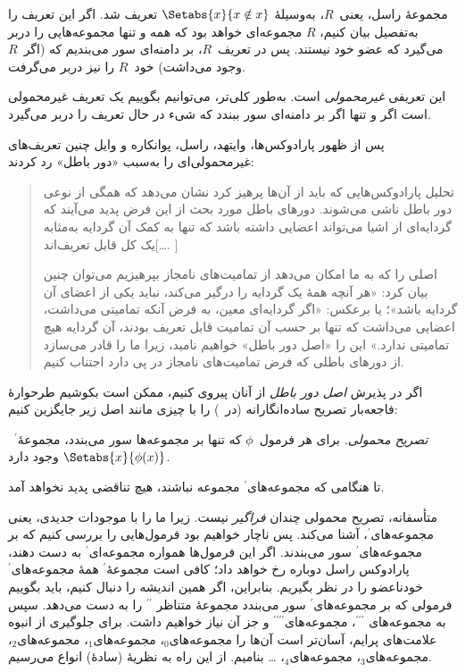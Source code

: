 \documentclass[../../../include/open-logic-section]{subfiles}
\begin{document}


مجموعهٔ راسل، یعنی~$R$، به‌وسیلهٔ
$\Setabs{x}{x \notin x}$ تعریف شد. اگر این تعریف را به‌تفصیل بیان کنیم،
$R$ مجموعه‌ای خواهد بود که همه و تنها مجموعه‌هایی را دربر می‌گیرد که عضو
خود نیستند. پس در تعریف~$R$، بر دامنه‌ای سور می‌بندیم که (اگر~$R$ وجود
می‌داشت) خود~$R$ را نیز دربر می‌گرفت.

این تعریفی \emph{غیرمحمولی} است. به‌طور کلی‌تر، می‌توانیم بگوییم یک تعریف
غیرمحمولی است اگر و تنها اگر بر دامنه‌ای سور ببندد که شیء در حال تعریف را
دربر می‌گیرد.
	
پس از ظهور پارادوکس‌ها، وایتهد، راسل، پوانکاره و وایل چنین تعریف‌های
غیرمحمولی‌ای را به‌سبب «دور باطل» رد کردند:
\begin{quote}
	تحلیل پارادوکس‌هایی که باید از آن‌ها پرهیز کرد نشان می‌دهد که همگی از
	نوعی دور باطل ناشی می‌شوند. دورهای باطل مورد بحث از این فرض پدید
	می‌آیند که گردایه‌ای از اشیا می‌تواند اعضایی داشته باشد که تنها به کمک
	آن گردایه به‌مثابه یک کل قابل تعریف‌اند[\ldots. \textparagraph]

	اصلی را که به ما امکان می‌دهد از تمامیت‌های نامجاز بپرهیزیم می‌توان
	چنین بیان کرد: «هر آنچه همهٔ یک گردایه را درگیر می‌کند، نباید یکی از
	اعضای آن گردایه باشد»؛ یا برعکس: «اگر گردایه‌ای معین، به فرض آنکه
	تمامیتی می‌داشت، اعضایی می‌داشت که تنها بر حسب آن تمامیت قابل تعریف
	بودند، آن گردایه هیچ تمامیتی ندارد.» این را «اصل دور باطل» خواهیم
	نامید، زیرا ما را قادر می‌سازد از دورهای باطلی که فرض تمامیت‌های نامجاز
	در پی دارد اجتناب کنیم.
	\citep[p.~37]{WhiteheadRussell1910}
\end{quote}
اگر در پذیرش \emph{اصل دور باطل} از آنان پیروی کنیم، ممکن است بکوشیم
طرحوارهٔ فاجعه‌بار تصریح ساده‌انگارانه (در~)
را با چیزی مانند اصل زیر جایگزین کنیم:

\begin{defish}
\emph{تصریح محمولی.} برای هر فرمول~$\phi$ که تنها بر مجموعه‌ها سور می‌بندد، مجموعهٔ$^\prime$~$\Setabs{x}{\phi(x)}$ وجود دارد.
\end{defish}

تا هنگامی که مجموعه‌های$^\prime$ مجموعه نباشند، هیچ تناقضی پدید نخواهد آمد.

متأسفانه، تصریح محمولی چندان \emph{فراگیر} نیست. زیرا ما را با موجودات
جدیدی، یعنی مجموعه‌های$^\prime$، آشنا می‌کند. پس ناچار خواهیم بود
فرمول‌هایی را بررسی کنیم که بر مجموعه‌های$^\prime$ سور می‌بندند. اگر این
فرمول‌ها همواره مجموعه‌ای$^\prime$ به دست دهند، پارادوکس راسل دوباره رخ
خواهد داد؛ کافی است مجموعهٔ$^\prime$ همهٔ مجموعه‌های$^\prime$ خودناعضو را
در نظر بگیریم. بنابراین، اگر همین اندیشه را دنبال کنیم، باید بگوییم
فرمولی که بر مجموعه‌های$^\prime$ سور می‌بندد مجموعهٔ متناظر
$^{\prime\prime}$ را به دست می‌دهد. سپس به مجموعه‌های
$^{\prime\prime\prime}$، مجموعه‌های$^{\prime\prime\prime\prime}$ و جز آن
نیاز خواهیم داشت. برای جلوگیری از انبوه علامت‌های پرایم، آسان‌تر است آن‌ها
را مجموعه‌های$_0$، مجموعه‌های$_1$، مجموعه‌های$_2$، مجموعه‌های$_3$،
مجموعه‌های$_4$، \ldots{} بنامیم. از این راه به نظریهٔ (سادهٔ) انواع
می‌رسیم.
\end{document}
